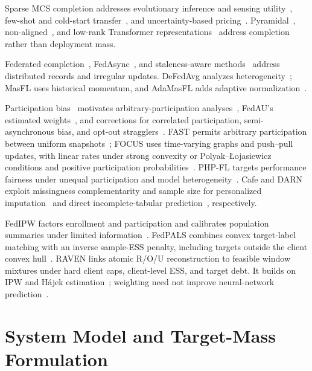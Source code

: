 \documentclass[letterpaper,journal]{IEEEtran}
\begin{document}
Sparse MCS completion addresses evolutionary inference and sensing
utility~\cite{wang2025evolutionary,xu2025rethinking}, few-shot and cold-start
transfer~\cite{wang2024fewshot,zhang2026mapt}, and uncertainty-based
pricing~\cite{liu2026pricing}. Pyramidal~\cite{liu2026pyramid},
non-aligned~\cite{liu2025nonaligned}, and low-rank Transformer
representations~\cite{kang2025strucformer} address completion rather than
deployment mass.

Federated completion~\cite{wang2026federated},
FedAsync~\cite{xie2019asynchronous}, and staleness-aware
methods~\cite{sun2024staleness,islam2025seafl,li2026stdfl} address distributed
records and irregular updates. DeFedAvg analyzes
heterogeneity~\cite{wang2025defedavg}; MasFL uses historical momentum, and
AdaMasFL adds adaptive normalization~\cite{yan2025momentum}.

Participation bias~\cite{benarba2025bias} motivates arbitrary-participation
analyses~\cite{wang2022unified}, FedAU's estimated
weights~\cite{wang2024lightweight}, and corrections for correlated participation,
semi-asynchronous bias, and opt-out
stragglers~\cite{sun2025debiasing,chen2026fedcure,goetze2025floss}.
FAST permits arbitrary participation between uniform snapshots~\cite{li2025fast}; FOCUS uses
time-varying graphs and push--pull updates, with linear rates under strong
convexity or Polyak--\L{}ojasiewicz conditions and positive participation
probabilities~\cite{ying2025focus}. PHP-FL targets performance fairness under
unequal participation and model heterogeneity~\cite{wu2025phpfl}.
Cafe and DARN exploit missingness complementarity and sample size for
personalized imputation~\cite{min2025cafe} and direct incomplete-tabular
prediction~\cite{zhang2025darn}, respectively.

FedIPW factors enrollment and participation and calibrates population
summaries under limited information~\cite{morishita2026who}.
FedPALS combines convex target-label matching with an inverse sample-ESS
penalty, including targets outside the client convex
hull~\cite{listozec2024overcoming}. RAVEN links atomic R/O/U reconstruction
to feasible window mixtures under hard client caps, client-level ESS,
and target debt. It builds on IPW and H\'ajek
estimation~\cite{horvitz1952generalization,hajek1971comment,shimodaira2000covariate,robins1994estimation};
weighting need not improve neural-network prediction~\cite{byrd2019importance}.

\section{System Model and Target-Mass Formulation}
\label{sec:system_model}
\end{document}
